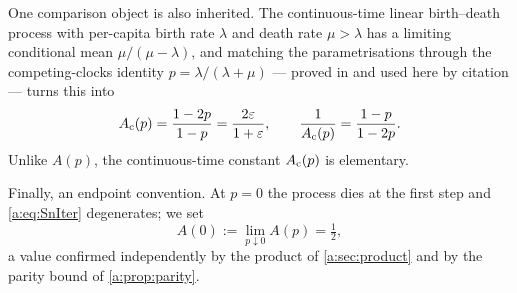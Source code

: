One comparison object is also inherited. The continuous-time linear birth--death
process with per-capita birth rate $\lambda$ and death rate $\mu>\lambda$ has a
limiting conditional mean $\mu/(\mu-\lambda)$, and matching the parametrisations
through the competing-clocks identity $p=\lambda/(\lambda+\mu)$ --- proved in
\ChM{} and used here by citation --- turns this into
\begin{equation}
\label{a:eq:Acts}
A_{\mathrm{c}}(p) = \frac{1-2p}{1-p} = \frac{2\varepsilon}{1+\varepsilon},
\qquad
\frac{1}{A_{\mathrm{c}}(p)} = \frac{1-p}{1-2p} .
\end{equation}
Unlike $A(p)$, the continuous-time constant $A_{\mathrm{c}}(p)$ is elementary.

Finally, an endpoint convention. At $p=0$ the process dies at the first step and
\cref{a:eq:SnIter} degenerates; we set
\begin{equation}
\label{a:eq:endpoint}
A(0) := \lim_{p\downarrow0}A(p) = \tfrac12,
\end{equation}
a value confirmed independently by the product of \cref{a:sec:product} and by the
parity bound of \cref{a:prop:parity}.
